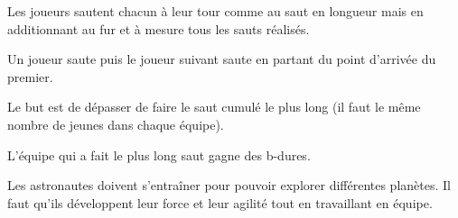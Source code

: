 \documentclass{grand-jeu}
\begin{document}
\begin{liste-materiel}
\end{liste-materiel}

\begin{regles}
Les joueurs sautent chacun à leur tour comme au saut en longueur mais en additionnant au fur et à mesure tous les sauts réalisés. 

Un joueur saute puis le joueur suivant saute en partant du point d'arrivée du premier. 

Le but est de dépasser de faire le saut cumulé le plus long (il faut le même nombre de jeunes dans chaque équipe). 

L'équipe qui a fait le plus long saut gagne des b-dures.
\end{regles}

\begin{imaginaire}
Les astronautes doivent s'entraîner pour pouvoir explorer différentes planètes. Il faut qu'ils développent leur force et leur agilité tout en travaillant en équipe. 
\end{imaginaire}

\begin{moments-stop}
\end{moments-stop}
\end{document}
